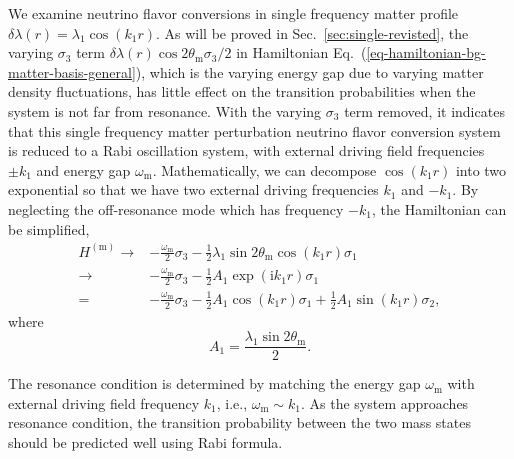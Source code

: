 \documentclass[%
reprint,
 amsmath,amssymb,
 prd,
]{revtex4-1}
\begin{document}
We examine neutrino flavor conversions in single frequency matter profile $\delta\lambda(r) = \lambda_1 \cos(k_1 r)$. As will be proved in Sec.~\ref{sec:single-revisted}, the varying $\sigma_3$ term $\delta\lambda(r) \cos 2\theta_{\mathrm m} \sigma_3/2$ in Hamiltonian Eq.~(\ref{eq-hamiltonian-bg-matter-basis-general}), which is the varying energy gap due to varying matter density fluctuations, has little effect on the transition probabilities when the system is not far from resonance. With the varying $\sigma_3$ term removed, it indicates that this single frequency matter perturbation neutrino flavor conversion system is reduced to a Rabi oscillation system, with external driving field frequencies $\pm k_1$ and energy gap $\omega_{\mathrm m}$. Mathematically, we can decompose $\cos( k_1 r )$ into two exponential so that we have two external driving frequencies $k_1$ and $-k_1$. By neglecting the off-resonance mode which has frequency $-k_1$, the Hamiltonian can be simplified,
\begin{align}
H^{(\mathrm{m})} \to & -\frac{\omega_{\mathrm m}}{2} \sigma_3  - \frac{1}{2} \lambda_1 \sin 2\theta_{\mathrm m} \cos( k_1 r ) \sigma_1\label{eq-hamiltonian-bg-matter-basis-single-frequency} \\
\to & -\frac{\omega_{\mathrm m}}{2} \sigma_3  - \frac{1}{2} A_1 \exp (\mathrm ik_1 r) \sigma_1 \nonumber \\
= & -\frac{\omega_{\mathrm m}}{2} \sigma_3  - \frac{1}{2} A_1 \cos ( k_1 r)  \sigma_1 + \frac{1}{2} A_1\sin(k_1 r) \sigma_2,\nonumber
\end{align}
where
\begin{equation}
A_1 = \frac{\lambda_1 \sin 2\theta_{\mathrm m} }{2}.
\label{eq-define-a1}
\end{equation}

The resonance condition is determined by matching the energy gap $\omega_{\mathrm m}$ with external driving field frequency $k_1$, i.e., $\omega_{\mathrm m} \sim k_1$. As the system approaches resonance condition, the transition probability between the two mass states should be predicted well using Rabi formula.
\end{document}

